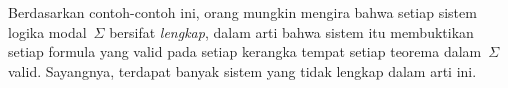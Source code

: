 \documentclass[../../../include/open-logic-section]{subfiles}
\begin{document}
Berdasarkan contoh-contoh ini, orang mungkin mengira bahwa setiap sistem
logika modal~$\Sigma$ bersifat \emph{lengkap}, dalam arti bahwa sistem itu
membuktikan setiap formula yang valid pada setiap kerangka tempat setiap
teorema dalam~$\Sigma$ valid. Sayangnya, terdapat banyak sistem yang tidak
lengkap dalam arti ini.
\end{document}
